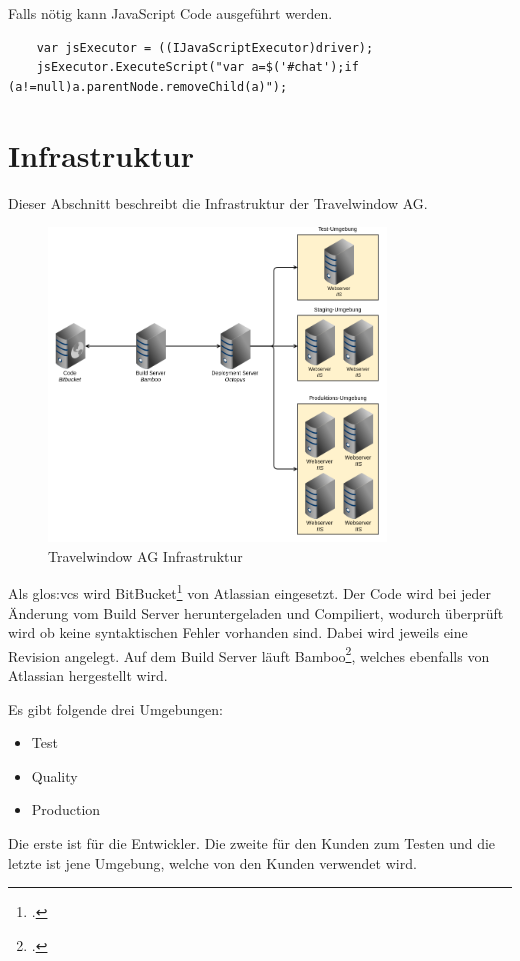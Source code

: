 Falls nötig kann JavaScript Code ausgeführt werden.

\begin{lstlisting}
	var jsExecutor = ((IJavaScriptExecutor)driver);
	jsExecutor.ExecuteScript("var a=$('#chat');if (a!=null)a.parentNode.removeChild(a)");
\end{lstlisting}


\section{Infrastruktur}
\label{sec:umsetzung:infrastruktur}
Dieser Abschnitt beschreibt die Infrastruktur der Travelwindow AG.

\begin{figure}[H]
	\centering
	\includegraphics[width=0.8\textwidth]{images/trv infrastructure.png}
	\caption{Travelwindow AG Infrastruktur}
	\label{fig:umsetzung:infrastruktur}
\end{figure}

Als \Gls{glos:vcs} wird BitBucket\footcite{Git_and_Mercurial_code_management_for_teams_2015-07-26} von Atlassian eingesetzt. Der Code wird bei jeder Änderung vom Build Server heruntergeladen und Compiliert, wodurch überprüft wird ob keine syntaktischen Fehler vorhanden sind. Dabei wird jeweils eine Revision angelegt. Auf dem Build Server läuft Bamboo\footcite{Bamboo_2015-07-26}, welches ebenfalls von Atlassian hergestellt wird. 

Es gibt folgende drei Umgebungen:
\begin{itemize}
\item Test
\item Quality
\item Production
\end{itemize}
Die erste ist für die Entwickler. Die zweite für den Kunden zum Testen und die letzte ist jene Umgebung, welche von den Kunden verwendet wird.


